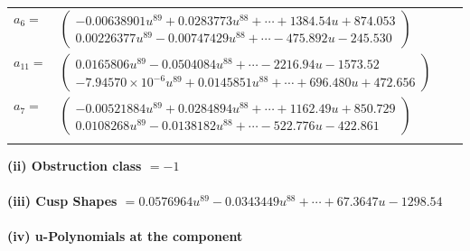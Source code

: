 \documentclass[1p]{elsarticle_modified}
\theoremstyle{definition}
\begin{document}
\begin{tabular}{m{7pt} m{180pt} m{7pt} m{180pt} }
\flushright $a_{6}=$&$\begin{pmatrix}-0.00638901 u^{89}+0.0283773 u^{88}+\cdots+1384.54 u+874.053\\0.00226377 u^{89}-0.00747429 u^{88}+\cdots-475.892 u-245.530\end{pmatrix}$ \\
\flushright $a_{11}=$&$\begin{pmatrix}0.0165806 u^{89}-0.0504084 u^{88}+\cdots-2216.94 u-1573.52\\-7.94570\times10^{-6} u^{89}+0.0145851 u^{88}+\cdots+696.480 u+472.656\end{pmatrix}$ \\
\flushright $a_{7}=$&$\begin{pmatrix}-0.00521884 u^{89}+0.0284894 u^{88}+\cdots+1162.49 u+850.729\\0.0108268 u^{89}-0.0138182 u^{88}+\cdots-522.776 u-422.861\end{pmatrix}$\\&\end{tabular}
\flushleft \textbf{(ii) Obstruction class $= -1$}\\~\\
\flushleft \textbf{(iii) Cusp Shapes $= 0.0576964 u^{89}-0.0343449 u^{88}+\cdots+67.3647 u-1298.54$}\\~\\
\newpage\renewcommand{\arraystretch}{1}
\flushleft \textbf{(iv) u-Polynomials at the component}\newline \\
\end{document}
